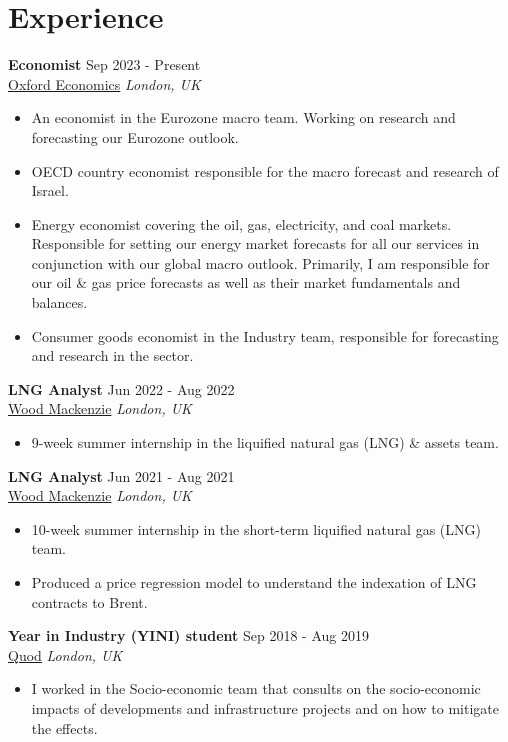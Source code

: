 \documentclass[11pt,a4paper]{article}
\begin{document}
\section{Experience}

\textbf{Economist} \hfill Sep 2023 - Present \\
\href{https://oxfordeconomics.com/}{Oxford Economics} \hfill \textit{London, UK}
\begin{itemize}[leftmargin=1.5em]
    \item An economist in the Eurozone macro team. Working on research and forecasting our Eurozone outlook.
    \item OECD country economist responsible for the macro forecast and research of Israel.
    \item Energy economist covering the oil, gas, electricity, and coal markets. Responsible for setting our energy market forecasts for all our services in conjunction with our global macro outlook. Primarily, I am responsible for our oil \& gas price forecasts as well as their market fundamentals and balances.
    \item Consumer goods economist in the Industry team, responsible for forecasting and research in the sector.
\end{itemize}

\textbf{LNG Analyst} \hfill Jun 2022 - Aug 2022 \\
\href{https://woodmac.com/}{Wood Mackenzie} \hfill \textit{London, UK}
\begin{itemize}[leftmargin=1.5em]
    \item 9-week summer internship in the liquified natural gas (LNG) \& assets team.
\end{itemize}

\textbf{LNG Analyst} \hfill Jun 2021 - Aug 2021 \\
\href{https://woodmac.com/}{Wood Mackenzie} \hfill \textit{London, UK}
\begin{itemize}[leftmargin=1.5em]
    \item 10-week summer internship in the short-term liquified natural gas (LNG) team.
    \item Produced a price regression model to understand the indexation of LNG contracts to Brent.
\end{itemize}

\textbf{Year in Industry (YINI) student} \hfill Sep 2018 - Aug 2019 \\
\href{https://quod.com/}{Quod} \hfill \textit{London, UK}
\begin{itemize}[leftmargin=1.5em]
    \item I worked in the Socio-economic team that consults on the socio-economic impacts of developments and infrastructure projects and on how to mitigate the effects.
\end{itemize}
\end{document}
